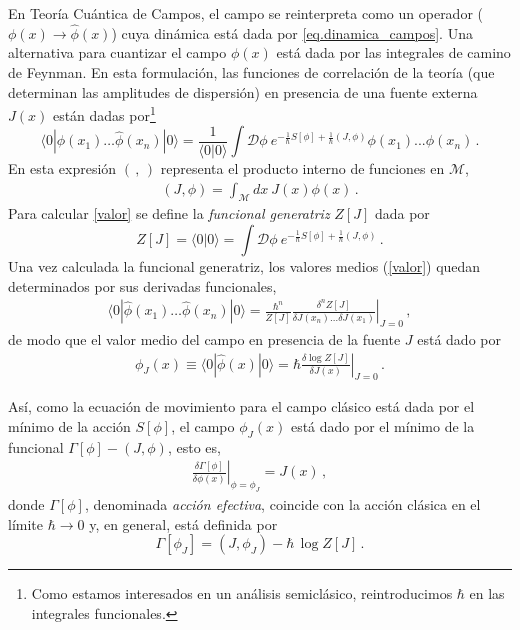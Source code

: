En Teoría Cuántica de Campos, el campo se reinterpreta como un operador ($\phi(x) \rightarrow \hat{\phi}(x)$) cuya dinámica está dada por \eqref{eq.dinamica_campos}. Una alternativa para cuantizar el campo $\phi(x)$ está dada por las integrales de camino de Feynman. En esta formulación, las funciones de correlación de la teoría (que determinan las amplitudes de dispersión) en presencia de una fuente externa $J(x)$ están dadas por\footnote{ Como estamos interesados en un análisis semiclásico, reintroducimos $\hbar$ en las integrales funcionales.}
\begin{equation}
\langle 0 | \hat{ \phi  } (x _1) \ldots \hat{\phi  } (x _n) | 0 \rangle = \frac{1}{\langle 0|0\rangle} 
\int  \mathscr D
\phi \ e ^{- \frac{1}{\hbar} S[ \phi ] + \frac{1}{\hbar} (J, \phi )} \phi (x _1) ... \phi (x _n)\,.
\label{valor}
\end{equation}
En esta expresión $(\,,\,) $ representa el producto interno de funciones en $\mathcal{M}$,
\begin{align}
	(J,\phi) = \int_\mathcal{M} dx\ J(x) \phi (x)\,.
\end{align}
Para calcular \eqref{valor} se define la {\it funcional generatriz} $Z[J]$ dada por
\begin{equation}
Z [J] = \langle0|0\rangle=
\int \mathscr D \phi \ e ^{- \frac{1}{ \hbar} S[ \phi ] + \frac{1}{\hbar} (J, \phi )}\,.
\label{eq.generatriz}
\end{equation}
Una vez calculada la funcional generatriz, los valores medios (\ref{valor}) quedan determinados por sus derivadas funcionales,
\begin{equation}
\begin{array}{c}
\langle 0 | \hat{ \phi  } (x _1) \ldots \hat{\phi  } (x _n) | 0 \rangle = \frac{\hbar ^n}{Z[J]}
\left. \frac{\delta ^n  Z[J] }{ \delta J(x_n) \ldots \delta J(x _1) } 		\right| _{J=0}\,,
\end{array}
\end{equation}
de modo que el valor medio del campo en presencia de la fuente $J$ está dado por
\begin{equation}
\begin{array}{c}
\phi _J (x) \equiv \langle 0| \hat{\phi } (x)| 0 \rangle = \hbar \left. \frac{\delta \log Z[J] }{\delta J(x)} \right| _{J=0} \,.
\end{array}
\end{equation}

Así, como la ecuación de movimiento para el campo clásico está dada por el mínimo de la acción $S[\phi]$, el campo $ \phi _J (x) $ está dado por el mínimo de la funcional $\Gamma[\phi]-(J,\phi)$, esto es,
\begin{equation}
\begin{array}{c}
\left.\frac{\delta \Gamma [ \phi ]  }{\delta \phi (x)  }\right|_{\phi=\phi_J} = 
J (x)\,,
\end{array}
\label{eq.accion1}
\end{equation}
donde $\Gamma[\phi]$, denominada {\it acción efectiva}, coincide con la acción clásica en el límite $\hbar\to 0$ y, en general, está definida por
\begin{equation}
\Gamma [\phi _J] = (J, \phi _J) -  \hbar \, \log Z [J]\,.
\label{efectiva}
\end{equation}

